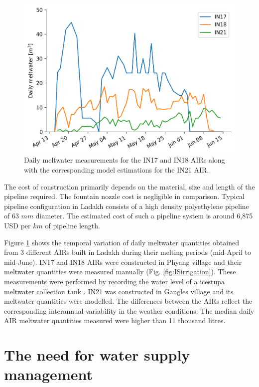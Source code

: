 \begin{figure}[htb]
\centering
\includegraphics[width=\textwidth]{figs/melt.png}
\caption{Daily meltwater measurements for the IN17 and IN18 AIRs along with the corresponding model estimations
for the IN21 AIR. }
\label{fig:ISmelt}
\end{figure}

The cost of construction primarily depends on the material, size and length of the pipeline required. The
fountain nozzle cost is negligible in comparison. Typical pipeline configuration in Ladakh consists of a high
density polyethylene pipeline of 63 $mm$ diameter. The estimated cost of such a pipeline system is around 6,875
USD per $km$ of pipeline length.

Figure \ref{fig:ISmelt} shows the temporal variation of daily meltwater quantities obtained from 3 different
AIRs built in Ladakh during their melting periods (mid-April to mid-June). IN17 and IN18 AIRs were constructed
in Phyang village and their meltwater quantities were measured manually (Fig. \ref{fig:ISirrigation}). These
measurements were performed by recording the water level of a icestupa meltwater collection tank
\citep{simantvermaIceStupaMeltwater2018}. IN21 was constructed in Gangles village and its meltwater quantities
were modelled. The differences between the AIRs reflect the corresponding interannual variability in the weather
conditions. The median daily AIR meltwater quantities measured were higher than 11 thousand litres. 

\section{The need for water supply management}

